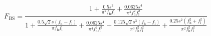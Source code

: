 \begin{equation}
F_{\mathrm{BS}} = \frac{1 + \frac{0.5 s^{2}}{\pi^{2} f_{\mathrm{h}} f_{\mathrm{l}}} + \frac{0.0625 s^{4}}{\pi^{4} f_{\mathrm{h}}^{2} f_{\mathrm{l}}^{2}}}{1 + \frac{0.5 \sqrt{2} s \left(f_{\mathrm{h}} - f_{\mathrm{l}}\right)}{\pi f_{\mathrm{h}} f_{\mathrm{l}}} + \frac{0.0625 s^{4}}{\pi^{4} f_{\mathrm{h}}^{2} f_{\mathrm{l}}^{2}} + \frac{0.125 \sqrt{2} s^{3} \left(f_{\mathrm{h}} - f_{\mathrm{l}}\right)}{\pi^{3} f_{\mathrm{h}}^{2} f_{\mathrm{l}}^{2}} + \frac{0.25 s^{2} \left(f_{\mathrm{h}}^{2} + f_{\mathrm{l}}^{2}\right)}{\pi^{2} f_{\mathrm{h}}^{2} f_{\mathrm{l}}^{2}}}
\end{equation}

